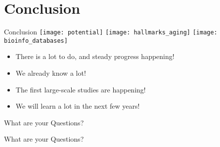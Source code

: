 \section{Conclusion}

\begin{frame}[c]{Conclusion}
    \texttt{[image: potential]}
    \texttt{[image: hallmarks\_aging]}
    \texttt{[image: bioinfo\_databases]} \\

    \large
    \begin{itemize}[<+(1)->]
        \item There is a lot to do, and steady progress happening!
        \item We already know a lot!
        \item The first large-scale studies are happening!
        \item We will learn a lot in the next few years!
    \end{itemize}
    \pause
    \LARGE
    What are your Questions?
\end{frame}


\addtocounter{framenumber}{1}
\begin{frame}[standout]
    \LARGE
    What are your Questions?
\end{frame}
